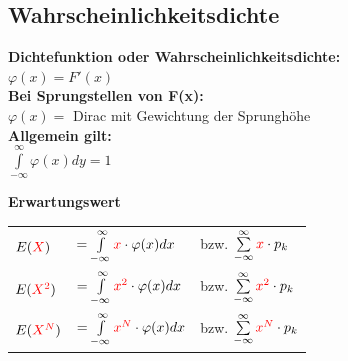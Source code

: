 \subsection{Wahrscheinlichkeitsdichte }
\begin{multicols}{2}
\textbf{Dichtefunktion oder Wahrscheinlichkeitsdichte:} \\
$\varphi(x) = F'(x)$ \\
\textbf{Bei Sprungstellen von F(x):} \\
$\varphi(x) = $ Dirac mit Gewichtung der Sprunghöhe\\
\textbf{Allgemein gilt:}\\
$\int\limits_{-\infty}^{\infty}\varphi (x) dy = 1$

\columnbreak

	\textbf{Erwartungswert} \\
	\begin{tabular}{l l l}
		$E(\textcolor{red}{X})$ &  
    $ = \int\limits_{-\infty}^{\infty} \textcolor{red}{x} \cdot \varphi(x) dx$  & 
    bzw. $\sum\limits_{-\infty}^{\infty} \textcolor{red}{x} \cdot p_k$\\
    
		$E(\textcolor{red}{X^2})$ & 
    $ = \int\limits_{-\infty}^{\infty} \textcolor{red}{x^2} \cdot \varphi(x) dx$ & 
    bzw. $\sum\limits_{-\infty}^{\infty} \textcolor{red}{x^2} \cdot p_k$\\
    
		$E(\textcolor{red}{X^N})$ & 
    $ = \int\limits_{-\infty}^{\infty} \textcolor{red}{x^N} \cdot \varphi(x) dx$ 
    & bzw. $\sum\limits_{-\infty}^{\infty} \textcolor{red}{x^N} \cdot p_k$
	\end{tabular}
\end{multicols}


